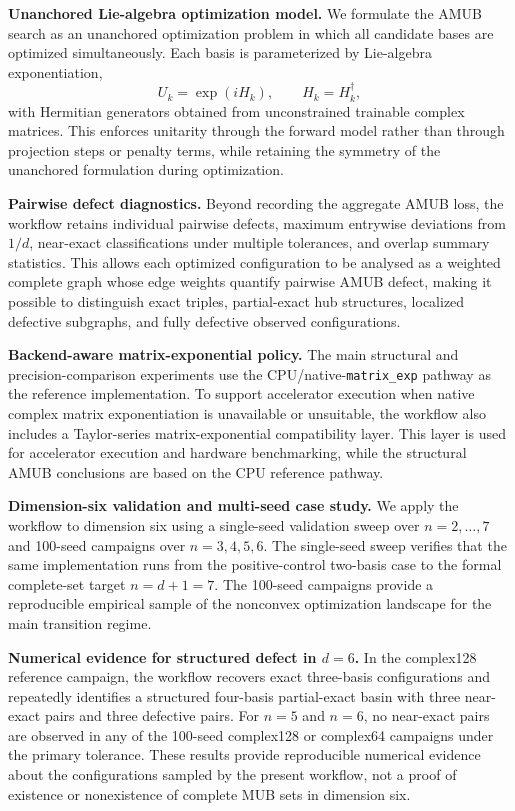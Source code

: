 \documentclass[a4paper,twocolumn,11pt,amsfonts,amssymb]{quantumarticle}
\begin{document}
\textbf{Unanchored Lie-algebra optimization model.}
We formulate the AMUB search as an unanchored optimization problem in which all candidate bases are optimized simultaneously. Each basis is parameterized by Lie-algebra exponentiation,
\[
U_k=\exp(iH_k), \qquad H_k=H_k^\dagger,
\]
with Hermitian generators obtained from unconstrained trainable complex matrices. This enforces unitarity through the forward model rather than through projection steps or penalty terms, while retaining the symmetry of the unanchored formulation during optimization.

\textbf{Pairwise defect diagnostics.}
Beyond recording the aggregate AMUB loss, the workflow retains individual pairwise defects, maximum entrywise deviations from \(1/d\), near-exact classifications under multiple tolerances, and overlap summary statistics. This allows each optimized configuration to be analysed as a weighted complete graph whose edge weights quantify pairwise AMUB defect, making it possible to distinguish exact triples, partial-exact hub structures, localized defective subgraphs, and fully defective observed configurations.

\textbf{Backend-aware matrix-exponential policy.}
The main structural and precision-comparison experiments use the CPU/native-\texttt{matrix\_exp} pathway as the reference implementation. To support accelerator execution when native complex matrix exponentiation is unavailable or unsuitable, the workflow also includes a Taylor-series matrix-exponential compatibility layer. This layer is used for accelerator execution and hardware benchmarking, while the structural AMUB conclusions are based on the CPU reference pathway.

\textbf{Dimension-six validation and multi-seed case study.}
We apply the workflow to dimension six using a single-seed validation sweep over \(n=2,\ldots,7\) and 100-seed campaigns over \(n=3,4,5,6\). The single-seed sweep verifies that the same implementation runs from the positive-control two-basis case to the formal complete-set target \(n=d+1=7\). The 100-seed campaigns provide a reproducible empirical sample of the nonconvex optimization landscape for the main transition regime.

\textbf{Numerical evidence for structured defect in \(d=6\).}
In the complex128 reference campaign, the workflow recovers exact three-basis configurations and repeatedly identifies a structured four-basis partial-exact basin with three near-exact pairs and three defective pairs. For \(n=5\) and \(n=6\), no near-exact pairs are observed in any of the 100-seed complex128 or complex64 campaigns under the primary tolerance. These results provide reproducible numerical evidence about the configurations sampled by the present workflow, not a proof of existence or nonexistence of complete MUB sets in dimension six.
\end{document}
